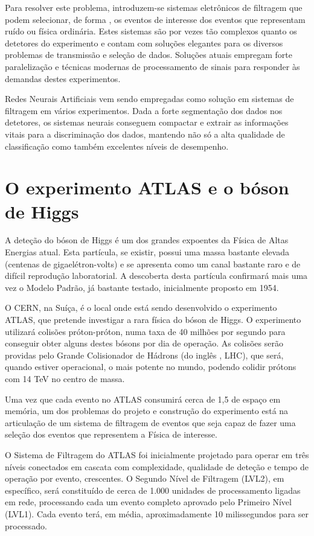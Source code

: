 Para resolver este problema, introduzem-se sistemas eletrônicos de filtragem
que podem selecionar, de forma , os eventos de interesse dos
eventos que representam ruído ou física ordinária. Estes sistemas são por
vezes tão complexos quanto os detetores do experimento e contam com soluções
elegantes para os diversos problemas de transmissão e seleção de
dados. Soluções atuais empregam forte paralelização e técnicas modernas de
processamento de sinais para responder às demandas destes experimentos.

Redes Neurais Artificiais vem sendo empregadas como solução em sistemas de
filtragem em vários experimentos. Dada a forte segmentação dos dados nos
detetores, os sistemas neurais conseguem compactar e extrair as informações
vitais para a discriminação dos dados, mantendo não só a alta qualidade de
classificação como também excelentes níveis de desempenho.

\section{O experimento ATLAS e o bóson de Higgs}

A deteção do bóson de Higgs é um dos grandes expoentes da Física de Altas
Energias atual. Esta partícula, se existir, possui uma massa bastante elevada
(centenas de gigaelétron-volts) e se apresenta como um canal bastante raro e
de difícil reprodução laboratorial. A descoberta desta partícula confirmará
mais uma vez o Modelo Padrão, já bastante testado, inicialmente proposto em
1954.

O CERN, na Suíça, é o local onde está sendo desenvolvido o experimento ATLAS,
que pretende investigar a rara física do bóson de Higgs. O experimento
utilizará colisões próton-próton, numa taxa de 40 milhões por segundo para
conseguir obter alguns destes bósons por dia de operação. As colisões serão
providas pelo Grande Colisionador de Hádrons (do inglês , LHC), que será, quando estiver operacional, o mais potente no
mundo, podendo colidir prótons com 14 TeV no centro de massa.

Uma vez que cada evento no ATLAS consumirá cerca de 1,5  de
espaço em memória, um dos problemas do projeto e construção do experimento
está na articulação de um sistema de filtragem de eventos que seja capaz de
fazer uma seleção  dos eventos que representem a Física de
interesse.

O Sistema de Filtragem do ATLAS foi inicialmente projetado para operar em três
níveis conectados em cascata com complexidade, qualidade de deteção e tempo de
operação por evento, crescentes. O Segundo Nível de Filtragem (LVL2), em
específico, será constituído de cerca de 1.000 unidades de processamento
ligadas em rede, processando cada um evento completo aprovado pelo Primeiro
Nível (LVL1). Cada evento terá, em média, aproximadamente 10 milissegundos
para ser processado.

